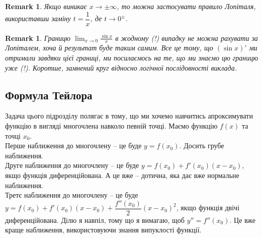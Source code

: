 \documentclass[a4paper, 14pt]{article}
\theoremstyle{theoremdd}
\theoremstyle{theoremdd}
\theoremstyle{theoremdd}
\theoremstyle{theoremdd}
\theoremstyle{theoremdd}
\theoremstyle{theoremdd}
\newtheorem{remark}[theorem]{Remark}
\theoremstyle{theoremdd}
\theoremstyle{theoremdd}
\begin{document}
\begin{remark}
Якщо виникає $x \to \pm \infty$, то можна застосувати правило Лопіталя, використавши заміну $t = \dfrac{1}{x}$, де $t \to 0^{\pm}$.
\end{remark}

\begin{remark}
Границю $\displaystyle \lim_{x \to 0} \frac{\sin x}{x}$ в жодному (!) випадку не можна рахувати за Лопіталем, хоча й результат буде таким самим. Все це тому, що $(\sin x)'$ ми отримали завдяки цієї границі, ми посилаємось на те, що ми знаємо цю границю уже (!). Коротше, замнений круг відносно логічної послідовності виклада.
\end{remark}

\subsection{Формула Тейлора}
Задача цього підрозділу полягає в тому, що ми хочемо навчитись апроксимувати функцію в вигляді многочлена навколо певній точці. Маємо функцію $f(x)$ та точці $x_0$.\\
Перше наближення до многочлену -- це буде $y = f(x_0)$. Досить грубе наближення.\\
Друге наближення до многочлену -- це буде $y = f(x_0) + f'(x_0)(x-x_0)$, якщо функція диференційована. А це вже -- дотична, яка дає вже нормальне наближення.\\
Третє наближення до многочлену -- це буде $y = f(x_0) + f'(x_0)(x-x_0) + \dfrac{f''(x_0)}{2}(x-x_0)^2$, якщо функція двічі диференційована. Ділю я навпіл, тому що я вимагаю, щоб $y''=f''(x_0)$. Це вже краще наближення, використовуючи знання випуклості функції.
\\ \iffalse %
\end{document}
